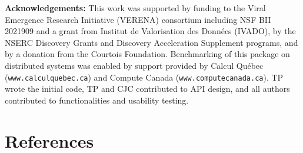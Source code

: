 \documentclass[11pt]{article}
\begin{document}
\textbf{Acknowledgements:} This work was supported by funding to the
Viral Emergence Research Initiative (VERENA) consortium including NSF
BII 2021909 and a grant from Institut de Valorisation des Données
(IVADO), by the NSERC Discovery Grants and Discovery Acceleration
Supplement programs, and by a donation from the Courtois Foundation.
Benchmarking of this package on distributed systems was enabled by
support provided by Calcul Québec (\texttt{www.calculquebec.ca}) and
Compute Canada (\texttt{www.computecanada.ca}). TP wrote the initial
code, TP and CJC contributed to API design, and all authors contributed
to functionalities and usability testing.

\hypertarget{references}{%
\section*{References}\label{references}}
\end{document}
